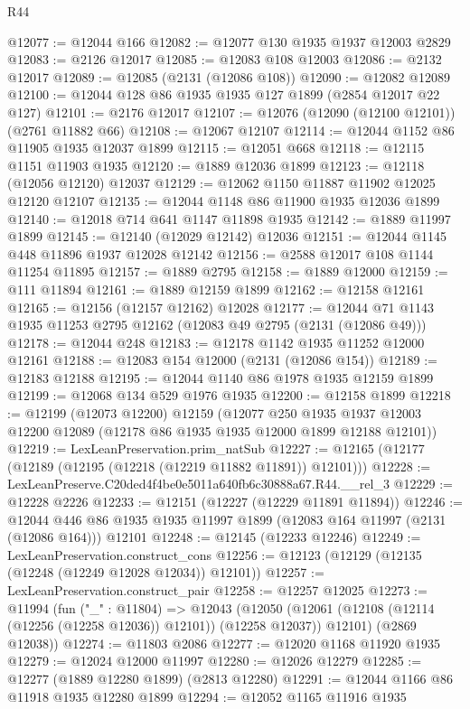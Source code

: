 \begin{lexlean}{R44}
\begin{coremodule}
@12077 := @12044 @166
@12082 := @12077 @130 @1935 @1937 @12003 @2829
@12083 := @2126 @12017
@12085 := @12083 @108 @12003
@12086 := @2132 @12017
@12089 := @12085 (@2131 (@12086 @108))
@12090 := @12082 @12089
@12100 := @12044 @128 @86 @1935 @1935 @127 @1899 (@2854 @12017 @22 @127)
@12101 := @2176 @12017
@12107 := @12076 (@12090 (@12100 @12101)) (@2761 @11882 @66)
@12108 := @12067 @12107
@12114 := @12044 @1152 @86 @11905 @1935 @12037 @1899
@12115 := @12051 @668
@12118 := @12115 @1151 @11903 @1935
@12120 := @1889 @12036 @1899
@12123 := @12118 (@12056 @12120) @12037
@12129 := @12062 @1150 @11887 @11902 @12025 @12120 @12107
@12135 := @12044 @1148 @86 @11900 @1935 @12036 @1899
@12140 := @12018 @714 @641 @1147 @11898 @1935
@12142 := @1889 @11997 @1899
@12145 := @12140 (@12029 @12142) @12036
@12151 := @12044 @1145 @448 @11896 @1937 @12028 @12142
@12156 := @2588 @12017 @108 @1144 @11254 @11895
@12157 := @1889 @2795
@12158 := @1889 @12000
@12159 := @111 @11894
@12161 := @1889 @12159 @1899
@12162 := @12158 @12161
@12165 := @12156 (@12157 @12162) @12028
@12177 := @12044 @71 @1143 @1935 @11253 @2795 @12162 (@12083 @49 @2795 (@2131 (@12086 @49)))
@12178 := @12044 @248
@12183 := @12178 @1142 @1935 @11252 @12000 @12161
@12188 := @12083 @154 @12000 (@2131 (@12086 @154))
@12189 := @12183 @12188
@12195 := @12044 @1140 @86 @1978 @1935 @12159 @1899
@12199 := @12068 @134 @529 @1976 @1935
@12200 := @12158 @1899
@12218 := @12199
    (@12073 @12200)
    @12159
    (@12077
      @250
      @1935
      @1937
      @12003
      @12200
      @12089
      (@12178 @86 @1935 @1935 @12000 @1899 @12188 @12101))
@12219 := LexLeanPreservation.prim_natSub
@12227 := @12165 (@12177 (@12189 (@12195 (@12218 (@12219 @11882 @11891)) @12101)))
@12228 := LexLeanPreserve.C20ded4f4be0e5011a640fb6c30888a67.R44.__rel_3
@12229 := @12228 @2226
@12233 := @12151 (@12227 (@12229 @11891 @11894))
@12246 := @12044 @446 @86 @1935 @1935 @11997 @1899 (@12083 @164 @11997 (@2131 (@12086 @164))) @12101
@12248 := @12145 (@12233 @12246)
@12249 := LexLeanPreservation.construct_cons
@12256 := @12123 (@12129 (@12135 (@12248 (@12249 @12028 @12034)) @12101))
@12257 := LexLeanPreservation.construct_pair
@12258 := @12257 @12025
@12273 := @11994
    (fun ("_" : @11804) =>
    @12043
      (@12050 (@12061 (@12108 (@12114 (@12256 (@12258 @12036)) @12101)) (@12258 @12037)) @12101)
      (@2869 @12038))
@12274 := @11803 @2086
@12277 := @12020 @1168 @11920 @1935
@12279 := @12024 @12000 @11997
@12280 := @12026 @12279
@12285 := @12277 (@1889 @12280 @1899) (@2813 @12280)
@12291 := @12044 @1166 @86 @11918 @1935 @12280 @1899
@12294 := @12052 @1165 @11916 @1935

\end{coremodule}
\end{lexlean}
